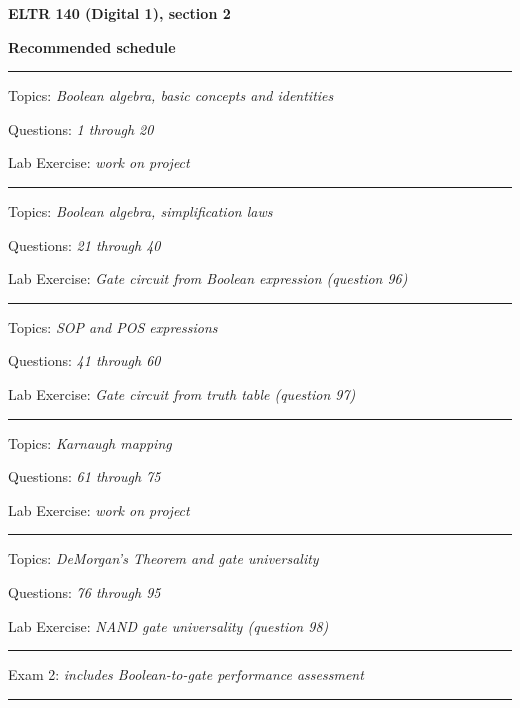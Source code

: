 
\centerline{\bf ELTR 140 (Digital 1), section 2} \bigskip 
 
\vskip 10pt

\noindent
{\bf Recommended schedule}

\vskip 5pt

\hrule \vskip 5pt
\noindent
{}

\hskip 10pt Topics: {\it Boolean algebra, basic concepts and identities}
 
\hskip 10pt Questions: {\it 1 through 20}
 
\hskip 10pt Lab Exercise: {\it work on project}
 
\vskip 10pt
\hrule \vskip 5pt
\noindent
{}

\hskip 10pt Topics: {\it Boolean algebra, simplification laws}
 
\hskip 10pt Questions: {\it 21 through 40}
 
\hskip 10pt Lab Exercise: {\it Gate circuit from Boolean expression (question 96)}
 
\vskip 10pt
\hrule \vskip 5pt
\noindent
{}

\hskip 10pt Topics: {\it SOP and POS expressions}
 
\hskip 10pt Questions: {\it 41 through 60}
 
\hskip 10pt Lab Exercise: {\it Gate circuit from truth table (question 97)}
 
\vskip 10pt
\hrule \vskip 5pt
\noindent
{}

\hskip 10pt Topics: {\it Karnaugh mapping}
 
\hskip 10pt Questions: {\it 61 through 75}
 
\hskip 10pt Lab Exercise: {\it work on project}
 
\vskip 10pt
\hrule \vskip 5pt
\noindent
{}

\hskip 10pt Topics: {\it DeMorgan's Theorem and gate universality}
 
\hskip 10pt Questions: {\it 76 through 95}
 
\hskip 10pt Lab Exercise: {\it NAND gate universality (question 98)}
 
\vskip 10pt
\hrule \vskip 5pt
\noindent
{}

\hskip 10pt Exam 2: {\it includes Boolean-to-gate performance assessment}
 
\vskip 10pt
\hrule \vskip 5pt
\noindent
{}

